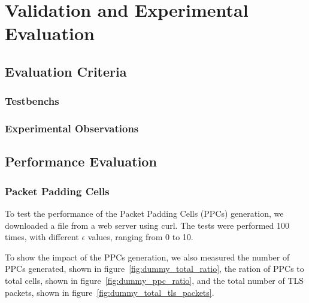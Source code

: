 
%

\chapter{Validation and Experimental Evaluation}\label{cha:validation}

\section{Evaluation Criteria}\label{sec:evaluation_criteria}

\subsection{Testbenchs}\label{sec:testbenchs}

\subsection{Experimental Observations}\label{sec:experimental_observations}

\section{Performance Evaluation}\label{sec:performance_evaluation}

\subsection{Packet Padding Cells}\label{sec:performance_evaluation_packet_padding_cells_tls_packets}

To test the performance of the Packet Padding Cells (PPCs) generation, we downloaded a file from a web server using curl. The tests were performed 100 times, with different $\epsilon$ values, ranging from 0 to 10. 

To show the impact of the PPCs generation, we also measured the number of PPCs generated, shown in figure~\ref{fig:dummy_total_ratio}, the ration of PPCs to total cells, shown in figure~\ref{fig:dummy_ppc_ratio}, and the total number of TLS packets, shown in figure~\ref{fig:dummy_total_tls_packets}.

